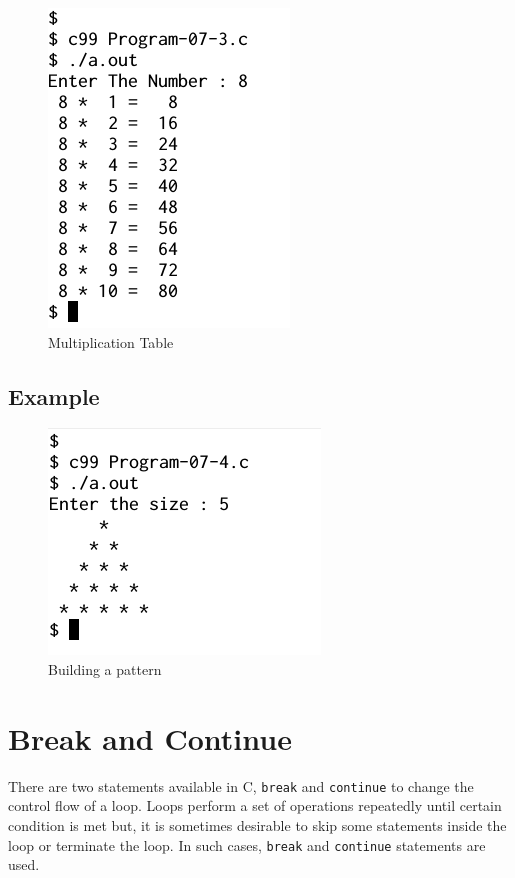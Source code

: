 \documentclass[11pt,a4paper]{article}
\begin{document}
\begin{figure}[ht]
\begin{center}
\includegraphics[scale=0.6]{Output-07-3.png}
\caption{Multiplication Table}
\label{output-07-3}
\end{center}
\end{figure}

\subsection*{Example} 


\begin{figure}[ht]
\begin{center}
\includegraphics[scale=0.6]{Output-07-4.png}
\caption{Building a pattern}
\label{output-07-4}
\end{center}
\end{figure}

\section*{Break and Continue}
There are two statements available in C, \lstinline{break} and \lstinline{continue} to change the control flow of a loop. Loops perform a set of operations repeatedly until certain condition is met but, it is sometimes desirable to skip some statements inside the loop or terminate the loop. In such cases, \lstinline!break! and \lstinline!continue! statements are used.
\end{document}
